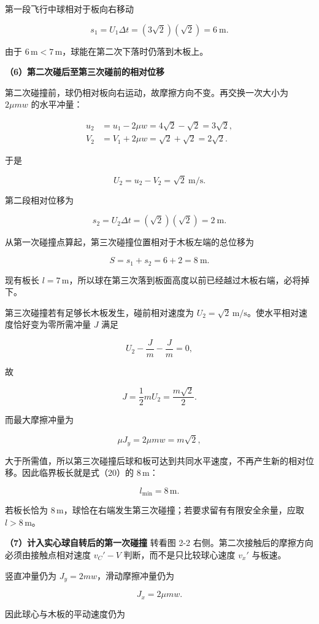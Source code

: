\documentclass[12pt,a4paper,UTF8]{ctexart}
\begin{document}
第一段飞行中球相对于板向右移动

\[s_1=U_1\Delta t=(3\sqrt2)(\sqrt2)=6\ \mathrm m.\]

由于 \(6\,\mathrm m<7\,\mathrm m\)，球能在第二次下落时仍落到木板上。

\textbf{（6）第二次碰后至第三次碰前的相对位移}

第二次碰撞前，球仍相对板向右运动，故摩擦方向不变。再交换一次大小为
\(2\mu mw\) 的水平冲量：

\[\begin{aligned}
u_2&=u_1-2\mu w=4\sqrt2-\sqrt2=3\sqrt2,\\
V_2&=V_1+2\mu w=\sqrt2+\sqrt2=2\sqrt2.
\end{aligned}\]

于是

\[U_2=u_2-V_2=\sqrt2\ \mathrm{m/s}.\]

第二段相对位移为

\[s_2=U_2\Delta t=(\sqrt2)(\sqrt2)=2\ \mathrm m.\]

从第一次碰撞点算起，第三次碰撞位置相对于木板左端的总位移为

\[S=s_1+s_2=6+2=8\ \mathrm m.\]

现有板长
\(l=7\,\mathrm m\)，所以球在第三次落到板面高度以前已经越过木板右端，必将掉下。

第三次碰撞若有足够长木板发生，碰前相对速度为
\(U_2=\sqrt2\,\mathrm{m/s}\)。使水平相对速度恰好变为零所需冲量 \(J\)
满足

\[U_2-\frac Jm-\frac Jm=0,\]

故

\[J=\frac12mU_2=\frac{m\sqrt2}{2}.\]

而最大摩擦冲量为

\[\mu J_y=2\mu mw=m\sqrt2,\]

大于所需值，所以第三次碰撞后球和板可达到共同水平速度，不再产生新的相对位移。因此临界板长就是式（20）的
\(8\,\mathrm m\)：

\[\boxed{l_{\min}=8\,\mathrm m}.\]

若板长恰为
\(8\,\mathrm m\)，球恰在右端发生第三次碰撞；若要求留有有限安全余量，应取
\(l>8\,\mathrm m\)。

\textbf{（7）计入实心球自转后的第一次碰撞} 转看图 2-2
右侧。第二次接触后的摩擦方向必须由接触点相对速度 \(v_C'-V\)
判断，而不是只比较球心速度 \(v_x'\) 与板速。

竖直冲量仍为 \(J_y=2mw\)，滑动摩擦冲量仍为

\[J_x=2\mu mw.\]

因此球心与木板的平动速度仍为
\end{document}
